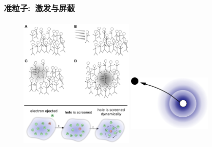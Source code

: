 \frame
{
	\frametitle{准粒子:~激发与屏蔽}
\begin{figure}[h!]
	\vspace{-0.12in}
\centering
\includegraphics[height=2.65in,width=2.25in,viewport=0 0 510 575,clip]{Figures/DFT_GW-2.jpg}
\includegraphics[height=1.80in,width=1.65in,viewport=0 0 455 525,clip]{Figures/DFT_GW-electron.jpg}
\label{Green's_function-quasi-particle}
\end{figure}
}

